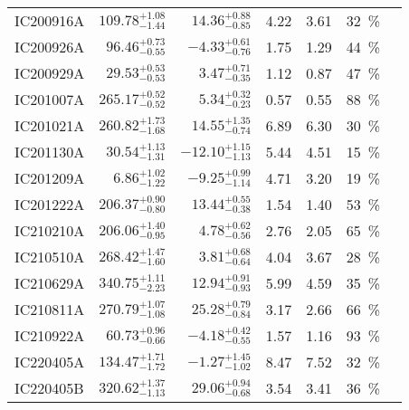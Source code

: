 \begin{table*}
\begin{tabular}{l r r r r c c}
        IC200916A & $109.78^{+1.08}_{-1.44}$ & $14.36^{+0.88}_{-0.85}$ & 4.22 & 3.61 & \SI{32}{\percent}&\cite{IC200916A1, IC200916A2, IC200916A3}\\
        IC200926A & $96.46^{+0.73}_{-0.55}$ & $-4.33^{+0.61}_{-0.76}$ & 1.75 & 1.29 & \SI{44}{\percent}&\cite{IC200926A1, IC200926A2}\\
        IC200929A & $29.53^{+0.53}_{-0.53}$ & $3.47^{+0.71}_{-0.35}$ & 1.12 & 0.87 & \SI{47}{\percent}&\cite{IC200929A1, IC200929A2}\\
        IC201007A & $265.17^{+0.52}_{-0.52}$ & $5.34^{+0.32}_{-0.23}$ & 0.57 & 0.55 & \SI{88}{\percent}&\cite{IC201007A1, IC201007A2}\\
        IC201021A & $260.82^{+1.73}_{-1.68}$ & $14.55^{+1.35}_{-0.74}$ & 6.89 & 6.30 & \SI{30}{\percent}&\cite{IC201021A1, IC201021A2}\\
        IC201130A & $30.54^{+1.13}_{-1.31}$ & $-12.10^{+1.15}_{-1.13}$ & 5.44 & 4.51 & \SI{15}{\percent}&\cite{IC201130A1, IC201130A2}\\
        IC201209A & $6.86^{+1.02}_{-1.22}$ & $-9.25^{+0.99}_{-1.14}$ & 4.71 & 3.20 & \SI{19}{\percent}&\cite{IC201209A1, IC201209A2}\\
        IC201222A & $206.37^{+0.90}_{-0.80}$ & $13.44^{+0.55}_{-0.38}$ & 1.54 & 1.40 & \SI{53}{\percent}&\cite{IC201222A1, IC201222A2}\\
        IC210210A & $206.06^{+1.40}_{-0.95}$ & $4.78^{+0.62}_{-0.56}$ & 2.76 & 2.05 & \SI{65}{\percent}&\cite{IC210210A1, IC210210A2}\\
        IC210510A & $268.42^{+1.47}_{-1.60}$ & $3.81^{+0.68}_{-0.64}$ & 4.04 & 3.67 & \SI{28}{\percent}&\cite{IC210510A1, IC210510A2}\\
        IC210629A & $340.75^{+1.11}_{-2.23}$ & $12.94^{+0.91}_{-0.93}$ & 5.99 & 4.59 & \SI{35}{\percent}&\cite{IC210629A1, IC210629A2, IC210629A3}\\
        IC210811A & $270.79^{+1.07}_{-1.08}$ & $25.28^{+0.79}_{-0.84}$ & 3.17 & 2.66 & \SI{66}{\percent}&\cite{IC210811A1, IC210811A2}\\
        IC210922A & $60.73^{+0.96}_{-0.66}$ & $-4.18^{+0.42}_{-0.55}$ & 1.57 & 1.16 & \SI{93}{\percent}&\cite{IC210922A1, IC210922A2}\\
        IC220405A & $134.47^{+1.71}_{-1.72}$ & $-1.27^{+1.45}_{-1.02}$ & 8.47 & 7.52 & \SI{32}{\percent}&\cite{IC220405A1, IC220405A2}\\
        IC220405B & $320.62^{+1.37}_{-1.13}$ & $29.06^{+0.94}_{-0.68}$ & 3.54 & 3.41 & \SI{36}{\percent}&\cite{IC220405B1, IC220405A2}\\

\end{tabular}
\end{table*}
